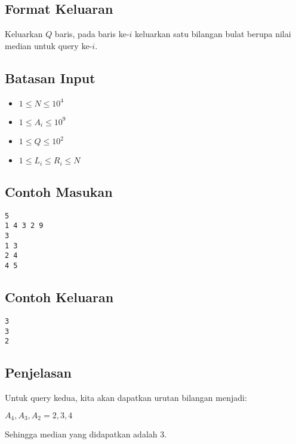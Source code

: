 \documentclass{article}
\begin{document}
\subsection*{Format Keluaran}
Keluarkan $Q$ baris, pada baris ke-$i$ keluarkan satu bilangan bulat berupa nilai median untuk query ke-$i$.

\subsection*{Batasan Input}

\begin{itemize}
    \item{$1 \leq N \leq 10^4$}
    \item{$1 \leq A_i \leq 10^9$}
    \item{$1 \leq Q \leq 10^2$}
    \item{$1 \leq L_i \leq R_i \leq N$}
\end{itemize}

\begin{multicols}{2}
\subsection*{Contoh Masukan}
\begin{lstlisting}
5
1 4 3 2 9
3
1 3
2 4
4 5
\end{lstlisting}
\columnbreak
\subsection*{Contoh Keluaran}
\begin{lstlisting}
3
3
2
\end{lstlisting}
\vfill
\null
\end{multicols}

\subsection*{Penjelasan}

Untuk query kedua, kita akan dapatkan urutan bilangan menjadi:

$A_4, A_3, A_2 = 2, 3, 4$

Sehingga median yang didapatkan adalah 3.
\end{document}
